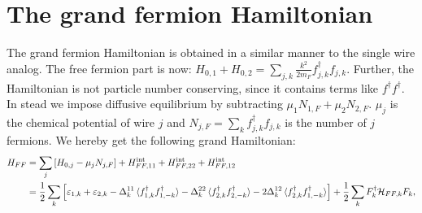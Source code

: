 \section{The grand fermion Hamiltonian}
The grand fermion Hamiltonian is obtained in a similar manner to the single wire analog. The free fermion part is now: $H_{0,1}+H_{0,2} = \sum_{j,k}\frac{k^2}{2m_F}f^\dagger_{j,k}f_{j,k}$. Further, the Hamiltonian is not particle number conserving, since it contains terms like $f^\dagger f^\dagger$. In stead we impose diffusive equilibrium by subtracting $\mu_1N_{1,F}+\mu_2N_{2,F}$. $\mu_j$ is the chemical potential of wire $j$ and $N_{j,F} = \sum_k f^\dagger_{j,k}f_{j,k}$ is the number of $j$ fermions. We hereby get the following grand Hamiltonian:
\begin{align}
H_{FF} &= \sum_j \left[H_{0,j} - \mu_j N_{j,F}\right] + H^\text{int}_{FF,11} + H^\text{int}_{FF,22} + H^\text{int}_{FF,12} \nonumber \\
       &= \frac{1}{2}\sum_k\left[\varepsilon_{1,k} + \varepsilon_{2,k} - \Delta^{11}_k\braket{f^\dagger_{1,k}f^\dagger_{1,-k}} - \Delta^{22}_k\braket{f^\dagger_{2,k}f^\dagger_{2,-k}} - 2\Delta^{12}_k\braket{f^\dagger_{2,k}f^\dagger_{1,-k}} \right] + \frac{1}{2}\sum_k F^\dagger_k \mathcal{H}_{FF,k}F_k,
\end{align}

